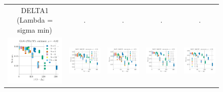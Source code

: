 \begin{figure}
\begin{tabular}{@{\hskip -0.0in}c@{\hskip -0.0in}c@{\hskip -0.0in}c@{\hskip -0.0in}c@{\hskip -0.0in}c@{\hskip -0.0in}}
		DELTA1 (Lambda = sigma min) & . & . & . & .\\
		\includegraphics[width=.2\linewidth]{figures/glove-wiki400k-am_sentiment_mr_test-acc_vs_gram-large-dim-delta1-2-trans_linx.pdf} &
		\includegraphics[width=.2\linewidth]{figures/glove-wiki400k-am_sentiment_subj_test-acc_vs_gram-large-dim-delta1-2-trans_linx.pdf} &
		\includegraphics[width=.2\linewidth]{figures/glove-wiki400k-am_sentiment_cr_test-acc_vs_gram-large-dim-delta1-2-trans_linx.pdf} &
		\includegraphics[width=.2\linewidth]{figures/glove-wiki400k-am_sentiment_sst_test-acc_vs_gram-large-dim-delta1-2-trans_linx.pdf} &
		\includegraphics[width=.2\linewidth]{figures/glove-wiki400k-am_sentiment_mpqa_test-acc_vs_gram-large-dim-delta1-2-trans_linx.pdf} \\
		

\end{tabular}
\end{figure}
